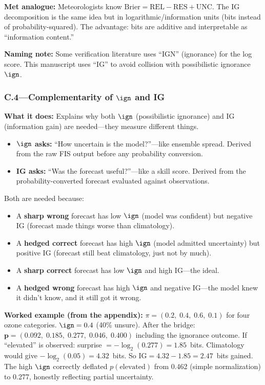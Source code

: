 \textbf{Met analogue:} Meteorologists know $\mathrm{Brier} = \mathrm{REL} - \mathrm{RES} + \mathrm{UNC}$. The IG decomposition is the same idea but in logarithmic/information units (bits instead of probability-squared). The advantage: bits are additive and interpretable as ``information content.''

\textbf{Naming note:} Some verification literature uses ``IGN'' (ignorance) for the log score. This manuscript uses ``IG'' to avoid collision with possibilistic ignorance $\ign$.

\subsubsection{C.4---Complementarity of $\ign$ and IG}\label{sec:plain_c4}

\textbf{What it does:} Explains why both $\ign$ (possibilistic ignorance) and IG (information gain) are needed---they measure different things.

\begin{itemize}[leftmargin=2em]
\item \textbf{$\ign$ asks:} ``How uncertain is the model?''---like ensemble spread. Derived from the raw FIS output before any probability conversion.
\item \textbf{IG asks:} ``Was the forecast useful?''---like a skill score. Derived from the probability-converted forecast evaluated against observations.
\end{itemize}

Both are needed because:

\begin{itemize}[leftmargin=2em]
\item A \textbf{sharp wrong} forecast has low $\ign$ (model was confident) but negative IG (forecast made things worse than climatology).
\item A \textbf{hedged correct} forecast has high $\ign$ (model admitted uncertainty) but positive IG (forecast still beat climatology, just not by much).
\item A \textbf{sharp correct} forecast has low $\ign$ and high IG---the ideal.
\item A \textbf{hedged wrong} forecast has high $\ign$ and negative IG---the model knew it didn't know, and it still got it wrong.
\end{itemize}

\textbf{Worked example (from the appendix):} $\pi = (0.2,\; 0.4,\; 0.6,\; 0.1)$ for four ozone categories. $\ign = 0.4$ (40\% unsure). After the bridge: $\mathbf{p} = (0.092,\; 0.185,\; 0.277,\; 0.046,\; 0.400)$ including the ignorance outcome. If ``elevated'' is observed: surprise $= -\log_2(0.277) = 1.85$~bits. Climatology would give $-\log_2(0.05) = 4.32$~bits. So $\mathrm{IG} = 4.32 - 1.85 = 2.47$~bits gained. The high $\ign$ correctly deflated $p(\text{elevated})$ from 0.462 (simple normalization) to 0.277, honestly reflecting partial uncertainty.

